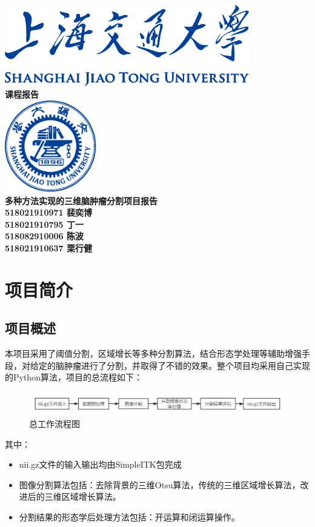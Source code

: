 \documentclass[UTF8]{ctexart}
\begin{document}
\begin{titlepage}
    \begin{center}
        \includegraphics[width=0.8\textwidth]{sjtu-name-blue.pdf}\\[1cm]
        \textsc{\Huge \bfseries 课程报告}\\[1.5cm]
        \includegraphics[width=0.3\textwidth]{sjtu-badge-blue.pdf}\\[0.5cm]    

        \Huge \bfseries{多种方法实现的三维脑肿瘤分割项目报告}\\[1cm]
        \Large \bfseries{518021910971 裴奕博}\\
        \Large \bfseries{518021910795 丁一}\\
        \Large \bfseries{518082910006 陈波}\\
        \Large \bfseries{518021910637 栗行健}
    \end{center}
\end{titlepage}
\tableofcontents

\newpage
\section{项目简介}
\subsection{项目概述}
本项目采用了阈值分割，区域增长等多种分割算法，结合形态学处理等辅助增强手段，对给定的脑肿瘤进行了分割，并取得了不错的效果。整个项目均采用自己实现的Python算法，项目的总流程如下：
\begin{figure}[H]
    \centering  %
    \includegraphics[width=\textwidth]{figure/workflow.png}
    \caption{总工作流程图}
\end{figure}
其中：
\begin{itemize}
    \item nii.gz文件的输入输出均由SimpleITK包完成
    \item 图像分割算法包括：去除背景的三维Otsu算法，传统的三维区域增长算法，改进后的三维区域增长算法。
    \item 分割结果的形态学后处理方法包括：开运算和闭运算操作。
\end{itemize}
\end{document}
